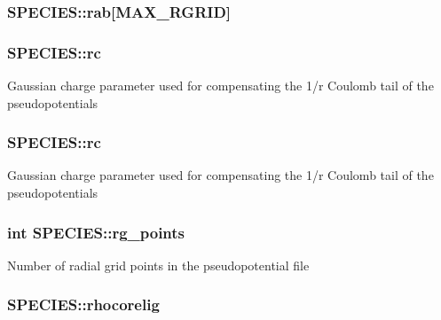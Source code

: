 \hypertarget{struct_s_p_e_c_i_e_s_aff7478f330801638d2517ae2f320297c}{
\subsubsection[{rab}]{ S\-P\-E\-C\-I\-E\-S\-::rab\mbox{[}{\bf M\-A\-X\-\_\-\-R\-G\-R\-I\-D}\mbox{]}}}\label{struct_s_p_e_c_i_e_s_aff7478f330801638d2517ae2f320297c}
\hypertarget{struct_s_p_e_c_i_e_s_aef0a165ae6573d48d9f00dc5993621f0}{
\subsubsection[{rc}]{ S\-P\-E\-C\-I\-E\-S\-::rc}}\label{struct_s_p_e_c_i_e_s_aef0a165ae6573d48d9f00dc5993621f0}
Gaussian charge parameter used for compensating the 1/r Coulomb tail of the pseudopotentials \hypertarget{struct_s_p_e_c_i_e_s_a9c42a064dc0dca3299b0f565d31a7354}{
\subsubsection[{rc}]{ S\-P\-E\-C\-I\-E\-S\-::rc}}\label{struct_s_p_e_c_i_e_s_a9c42a064dc0dca3299b0f565d31a7354}
Gaussian charge parameter used for compensating the 1/r Coulomb tail of the pseudopotentials \hypertarget{struct_s_p_e_c_i_e_s_a9998e10441c80b6287081f79e4d2637f}{
\subsubsection[{rg\-\_\-points}]{\setlength{\rightskip}{0pt plus 5cm}int S\-P\-E\-C\-I\-E\-S\-::rg\-\_\-points}}\label{struct_s_p_e_c_i_e_s_a9998e10441c80b6287081f79e4d2637f}
Number of radial grid points in the pseudopotential file \hypertarget{struct_s_p_e_c_i_e_s_a1285aacdede3997d5817069d5809f807}{
\subsubsection[{rhocorelig}]{ S\-P\-E\-C\-I\-E\-S\-::rhocorelig}}\label{struct_s_p_e_c_i_e_s_a1285aacdede3997d5817069d5809f807}
